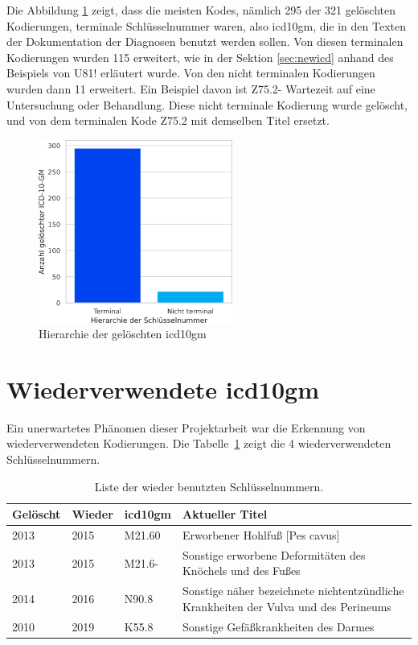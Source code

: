 Die Abbildung \ref{fig:oldicdort} zeigt, dass die meisten Kodes, nämlich 295 der 321 gelöschten Kodierungen, terminale Schlüsselnummer waren, also \ac{icd10gm}, die in den Texten der Dokumentation der Diagnosen benutzt werden sollen. Von diesen terminalen Kodierungen wurden 115 erweitert, wie in der Sektion \ref{sec:newicd} anhand des Beispiels von \textsf{U81!} erläutert wurde. Von den nicht terminalen Kodierungen wurden dann 11 erweitert. Ein Beispiel davon ist \textsf{Z75.2-} \textsf{Wartezeit auf eine Untersuchung oder Behandlung}. Diese nicht terminale Kodierung wurde gelöscht, und von dem terminalen Kode \textsf{Z75.2} mit demselben Titel ersetzt. 


\begin{figure}[ht]
	\centering
	\includegraphics[height=6cm]{figures/ortoldYear}
	\caption{Hierarchie der gelöschten \acs{icd10gm}}
	\label{fig:oldicdort}
\end{figure}


\section{Wiederverwendete \acs{icd10gm}} \label{sec:delinicd}

Ein unerwartetes Phänomen dieser Projektarbeit war die Erkennung von wiederverwendeten Kodierungen. Die Tabelle~\ref{tab:wieder} zeigt die 4 wiederverwendeten Schlüsselnummern.

\begin{table}[ht]
	\centering
	\small
	\caption[Wieder benutzte \acs{icd10gm}]{Liste der wieder benutzten Schlüsselnummern.}
	\label{tab:wieder}
	\begin{tabular}{|l|l|l|p{6cm}|}
		\hline
		\rowcolor{lightgray} Gelöscht & Wieder & \ac{icd10gm} & Aktueller Titel \\ \hline
		2013 & 2015 & M21.60 & Erworbener Hohlfuß [Pes cavus] \\ \hline
		2013 & 2015 & M21.6- & Sonstige erworbene Deformitäten des Knöchels und des Fußes \\ \hline
		2014 & 2016 & N90.8 & Sonstige näher bezeichnete nichtentzündliche Krankheiten der Vulva und des Perineums \\ \hline
		2010 & 2019 & K55.8 & Sonstige Gefäßkrankheiten des Darmes \\ \hline

\end{tabular}
\end{table}

